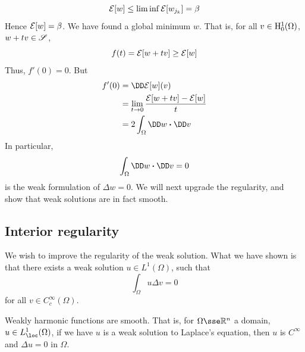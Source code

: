 \documentclass{article}
\begin{document}
\[\mathcal{E}[w] \le \liminf \mathcal{E}[w_{j_k}] = \beta\]
Hence \(\mathcal{E}[w] = \beta\). We have found a global minimum \(w\). That is, for all \(v \in \mathrm{H}^1_0(\Omega)\), \(w + tv \in \mathscr{S}\),
\[f(t) = \mathcal{E}[w + tv] \ge \mathcal{E}[w]\]
Thus, \(f'(0) = 0\). But
\begin{align*}
    f'(0) &= \DD \mcE[w](v) \\
    &=\lim_{t \to 0}\frac{\mcE[w + t v] - \mcE[w]}{t} \\
    &= 2\int_\Omega \DD w \vdot \DD v
\end{align*}
In particular,
\[\int_\Omega \DD w \vdot \DD v = 0\]
is the weak formulation of \(\Delta w = 0\). We will next upgrade the regularity, and show that weak solutions are in fact smooth.

\subsection{Interior regularity}

We wish to improve the regularity of the weak solution. What we have shown is that there exists a weak solution \(u \in L^1(\Omega)\), such that
\[\int_\Omega u \Delta v = 0\]
for all \(v \in C_c^\infty(\Omega)\).

\begin{theorem}
     Weakly harmonic functions are smooth. That is, for \(\Omega \sse \R^n\) a domain, \(u \in L^1_\loc(\Omega)\), if we have \(u\) is a weak solution to Laplace's equation, then \(u\) is \(C^\infty\) and \(\Delta u = 0\) in \(\Omega\).
\end{theorem}
\end{document}
